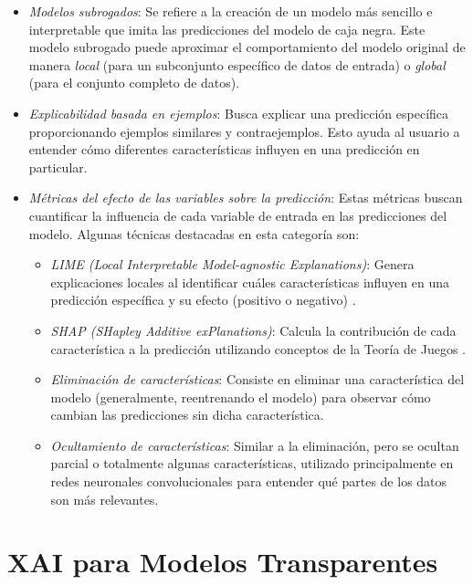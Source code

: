 \begin{itemize}
    \item \textit{Modelos subrogados}: Se refiere a la creación de un modelo más sencillo e interpretable que imita las predicciones del modelo de caja negra. Este modelo subrogado puede aproximar el comportamiento del modelo original de manera \textit{local} (para un subconjunto específico de datos de entrada) o \textit{global} (para el conjunto completo de datos).
    
    \item \textit{Explicabilidad basada en ejemplos}: Busca explicar una predicción específica proporcionando ejemplos similares y contraejemplos. Esto ayuda al usuario a entender cómo diferentes características influyen en una predicción en particular.
    
    \item \textit{Métricas del efecto de las variables sobre la predicción}: Estas métricas buscan cuantificar la influencia de cada variable de entrada en las predicciones del modelo. Algunas técnicas destacadas en esta categoría son:
    \begin{itemize}
        \item \textit{LIME (Local Interpretable Model-agnostic Explanations)}: Genera explicaciones locales al identificar cuáles características influyen en una predicción específica y su efecto (positivo o negativo) \cite{ribeiro2016should}.
        \item \textit{SHAP (SHapley Additive exPlanations)}: Calcula la contribución de cada característica a la predicción utilizando conceptos de la Teoría de Juegos \cite{lundberg2017unified}.
        \item \textit{Eliminación de características}: Consiste en eliminar una característica del modelo (generalmente, reentrenando el modelo) para observar cómo cambian las predicciones sin dicha característica.
        \item \textit{Ocultamiento de características}: Similar a la eliminación, pero se ocultan parcial o totalmente algunas características, utilizado principalmente en redes neuronales convolucionales para entender qué partes de los datos son más relevantes.
    \end{itemize}
\end{itemize}


\section{XAI para Modelos Transparentes}

